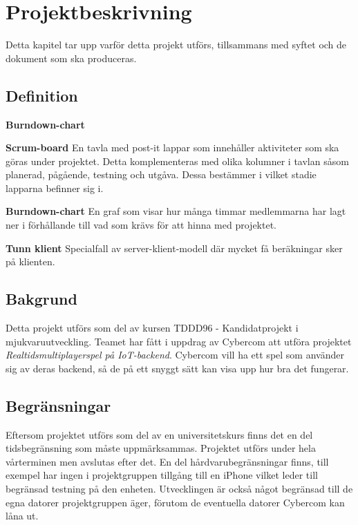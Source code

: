 \section{Projektbeskrivning}

Detta kapitel tar upp varför detta projekt utförs, tillsammans med syftet och de dokument som ska produceras.

\subsection{Definition}
\begin{labeling}{\textbf{Burndown-chart}}
\item [\textbf{Scrum-board}] En tavla med post-it lappar som innehåller aktiviteter som ska göras under 
    projektet. Detta komplementeras med olika kolumner i tavlan såsom planerad, pågående, 
    testning och utgåva. Dessa bestämmer i vilket stadie lapparna befinner sig i. 
\item
\item [\textbf{Burndown-chart}] En graf som visar hur många timmar medlemmarna har lagt ner i förhållande till vad som krävs för att hinna med projektet.
\item
\item [\textbf{Tunn klient}] Specialfall av server-klient-modell där mycket få beräkningar sker på klienten.
\item
\end{labeling}


\subsection{Bakgrund}
Detta projekt utförs som del av kursen TDDD96 - Kandidatprojekt i mjukvaruutveckling. Teamet har fått i uppdrag av Cybercom att utföra projektet \textit{Realtidsmultiplayerspel på IoT-backend}. Cybercom vill ha ett spel som använder sig av deras backend, så de på ett snyggt sätt kan visa upp hur bra det fungerar.

\subsection{Begränsningar}
Eftersom projektet utförs som del av en universitetskurs finns det en del tidsbegränsning som måste uppmärksammas. Projektet utförs under hela vårterminen men avslutas efter det. En del hårdvarubegränsningar finns, till exempel har ingen i projektgruppen tillgång till en iPhone vilket leder till begränsad testning på den enheten. Utvecklingen är också något begränsad till de egna datorer projektgruppen äger, förutom de eventuella datorer Cybercom kan låna ut.

